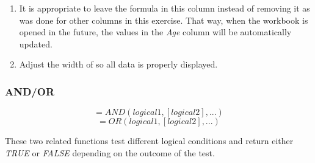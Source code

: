 \begin{enumbox}
\begin{enumerate}
		\item It is appropriate to leave the formula in this column instead of removing it as was done for other columns in this exercise. That way, when the workbook is opened in the future, the values in the \textit{Age} column will be automatically updated.
		\item Adjust the width of  so all data is properly displayed.
	\end{enumerate}
\end{enumbox}
	
\subsubsection{AND/OR}

\[ =AND(logical1, [logical2], ...) \]
\[ =OR(logical1, [logical2], ...) \]

These two related functions test different logical conditions and return either \textit{TRUE} or \textit{FALSE} depending on the outcome of the test. 

